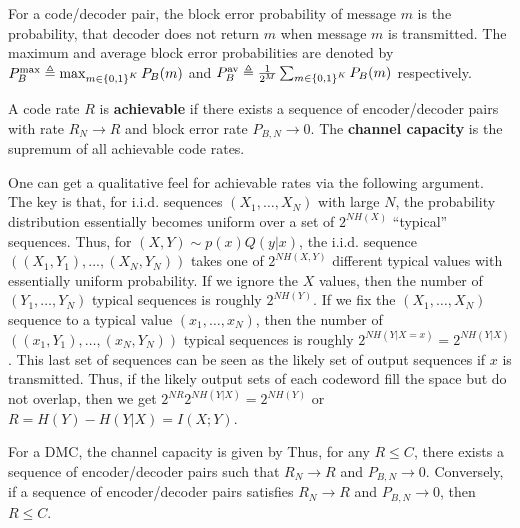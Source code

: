 \documentclass[letterpaper,10pt,english]{article}
\begin{document}
\begin{defn}
For a code/decoder pair, the block error probability of message $m$ is the probability, 
that decoder does not return $m$ when message $m$ is transmitted. 
The maximum and average block error probabilities are denoted by $P_B^{\max} \triangleq \max_{m \in \left\{0,1\right\}^K} P_B(m)$ and $P_B^{\text{av}} \triangleq \frac{1}{2^M}\sum_{m \in \left\{0,1\right\}^K}P_B(m)$ respectively. 
\end{defn} 
\begin{defn}
A code rate $R$ is \textbf{achievable} if there exists a sequence of encoder/decoder pairs with rate $R_N \to R$ and block error rate $P_{B,N} \to 0$. 
The \textbf{channel capacity} is the supremum of all achievable code rates.
\end{defn}
\begin{rem} 
One can get a qualitative feel for achievable rates via the following argument. 
The key is that, for i.i.d. sequences $(X_1,  \dots , X_N)$ with large $N$, 
the probability distribution essentially becomes uniform over a set of $2^{NH(X)}$ ``typical'' sequences. 
Thus, for $(X,Y) \sim p(x)Q(y|x)$, the i.i.d. sequence $((X_1, Y_1), . . . , (X_N , Y_N))$ takes one of 
$2^{NH(X,Y)}$ different typical values with essentially uniform probability. 
If we ignore the $X$ values, then the number of $(Y_1, \dots, Y_N)$ typical sequences is roughly $2^{NH(Y)}$. 
If we fix the $(X_1, \dots, X_N)$ sequence to a typical value $(x_1, \dots, x_N)$, 
then the number of $((x_1,Y_1), \dots, (x_N,Y_N))$ typical sequences is roughly $2^{NH(Y|X=x)} = 2^{NH(Y|X)}$. 
This last set of sequences can be seen as the likely set of output sequences if $x$ is transmitted. 
Thus, if the likely output sets of each codeword fill the space but do not overlap, then we get $2^{NR}2^{NH(Y|X)} = 2^{NH(Y)}$ or $R=H(Y) -H(Y|X)=I(X;Y)$. 
\end{rem}
\begin{thm}  
For a DMC, the channel capacity is given by
Thus, for any $R \le C$, there exists a sequence of encoder/decoder pairs such that $R_N \to R$ and $P_{B,N} \to 0$. 
Conversely, if a sequence of encoder/decoder pairs satisfies $R_N \to R$ and $P_{B,N}  \to 0$, then $R \le C$. 
\end{thm}
\end{document}
